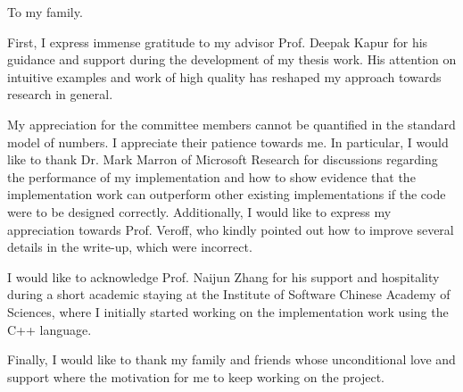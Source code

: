 \begin{dedication}
  To my family.
\end{dedication}

\begin{acknowledgments}
  \vspace{1.1in}

  First, I express immense gratitude to my
  advisor Prof. Deepak Kapur for his guidance 
  and support during the development of my 
  thesis work. His attention on intuitive 
  examples and work of high quality has
  reshaped my approach towards research in 
  general. 

  My appreciation for the committee members
  cannot be quantified in the standard
  model of numbers. I appreciate their patience 
  towards me.
  In particular, I would like to thank Dr. Mark
  Marron of Microsoft Research for discussions 
  regarding the performance
  of my implementation and how to show evidence
  that the implementation work can outperform
  other existing implementations if the 
  code were to be designed correctly. 
  Additionally, I would like to express 
  my appreciation towards Prof. Veroff, who kindly 
  pointed out how to improve several details 
  in the write-up, which were
  incorrect.

  I would like to acknowledge Prof. Naijun Zhang
  for his support and hospitality during a
  short academic staying at the Institute
  of Software Chinese Academy of Sciences, where
  I initially started working on the 
  implementation work using the C++ language.

  Finally, I would like to thank my family and
  friends whose unconditional love and support 
  where the motivation for me to keep working 
  on the project.

\end{acknowledgments}

